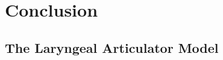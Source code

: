 \chapter{Conclusion} \label{ch:conclusion}

\section{The Laryngeal Articulator Model}\label{sec:lam}

\citet{eslingThereAreNo2005,eslingVoiceQualityLaryngeal2019,moisikPhonologicalPotentialsLower2021,moisikMultimodalImagingGlottal2015,moisikModelingBiomechanicalInfluence2014}

